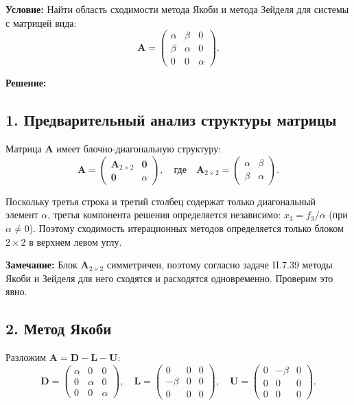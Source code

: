 \documentclass{article}
\begin{document}
\textbf{Условие:} Найти область сходимости метода Якоби и метода Зейделя для системы с матрицей вида:
\begin{equation}
\mathbf{A} = \begin{pmatrix} \alpha & \beta & 0 \\ \beta & \alpha & 0 \\ 0 & 0 & \alpha \end{pmatrix}.
\end{equation}

\vspace{0.5cm}
\textbf{Решение:}

\subsection*{1. Предварительный анализ структуры матрицы}

Матрица $\mathbf{A}$ имеет блочно-диагональную структуру:
\begin{equation}
\mathbf{A} = \begin{pmatrix} \mathbf{A}_{2\times 2} & \mathbf{0} \\ \mathbf{0} & \alpha \end{pmatrix}, \quad \text{где} \quad \mathbf{A}_{2\times 2} = \begin{pmatrix} \alpha & \beta \\ \beta & \alpha \end{pmatrix}.
\end{equation}

Поскольку третья строка и третий столбец содержат только диагональный элемент $\alpha$, третья компонента решения определяется независимо: $x_3 = f_3/\alpha$ (при $\alpha \neq 0$). Поэтому сходимость итерационных методов определяется только блоком $2\times 2$ в верхнем левом углу.

\textbf{Замечание:} Блок $\mathbf{A}_{2\times 2}$ симметричен, поэтому согласно задаче II.7.39 методы Якоби и Зейделя для него сходятся и расходятся одновременно. Проверим это явно.

\subsection*{2. Метод Якоби}

Разложим $\mathbf{A} = \mathbf{D} - \mathbf{L} - \mathbf{U}$:
\begin{equation}
\mathbf{D} = \begin{pmatrix} \alpha & 0 & 0 \\ 0 & \alpha & 0 \\ 0 & 0 & \alpha \end{pmatrix}, \quad
\mathbf{L} = \begin{pmatrix} 0 & 0 & 0 \\ -\beta & 0 & 0 \\ 0 & 0 & 0 \end{pmatrix}, \quad
\mathbf{U} = \begin{pmatrix} 0 & -\beta & 0 \\ 0 & 0 & 0 \\ 0 & 0 & 0 \end{pmatrix}.
\end{equation}
\end{document}
